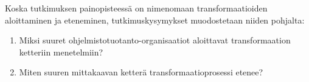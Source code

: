 Koska tutkimuksen painopisteessä on nimenomaan transformaatioiden
aloittaminen ja eteneminen, tutkimuskysymykset muodostetaan niiden
pohjalta:

\begin{enumerate}
        \item Miksi suuret ohjelmistotuotanto-organisaatiot aloittavat
                transformaation ketteriin menetelmiin?
        \item Miten suuren mittakaavan ketterä transformaatioprosessi etenee?
\end{enumerate}
